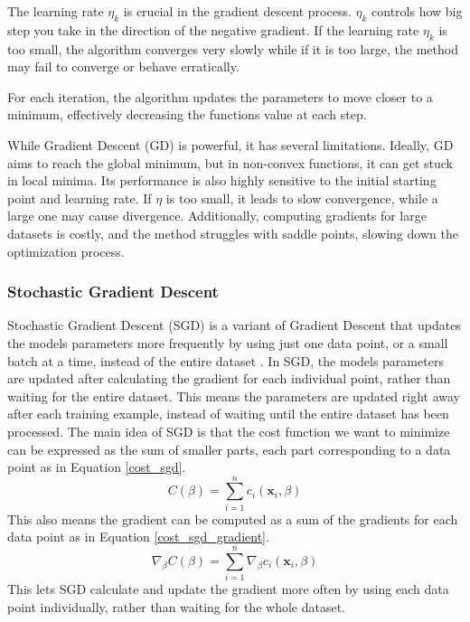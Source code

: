 \documentclass{article}
\newcommand{\0}{\mathbf{0}}
\newcommand{\1}{\mathbf{1}}
\begin{document}
The learning rate \( \eta_k \) is crucial in the gradient descent process. \( \eta_k \) controls how big step you take in the direction of the negative gradient. If the learning rate \( \eta_k \) is too small, the algorithm converges  very slowly while if it is too large, the method may fail to converge or behave erratically. 

For each iteration, the algorithm updates the parameters to move closer to a minimum, effectively decreasing the functions value at each step.




While Gradient Descent (GD) is powerful, it has several limitations. Ideally, GD aims to reach the global minimum, but in non-convex functions, it can get stuck in local minima. Its performance is also highly sensitive to the initial starting point and learning rate. If \(\eta\) is too small, it leads to slow convergence, while a large one may cause divergence. Additionally, computing gradients for large datasets is costly, and the method struggles with saddle points, slowing down the optimization process. 




\subsubsection{Stochastic Gradient Descent}


Stochastic Gradient Descent (SGD) is a variant of Gradient Descent that updates the models parameters more frequently by using just one data point, or a small batch at a time, instead of the entire dataset \cite{uke39}.
In SGD, the models parameters are updated after calculating the gradient for each individual point, rather than waiting for the entire dataset. This means the parameters are updated right away after each training example, instead of waiting until the entire dataset has been processed.
The main idea of SGD is that the cost function we want to minimize can be expressed as the sum of smaller parts, each part corresponding to a data point as in Equation \ref{cost_sgd}.
\begin{equation}
  C(\beta) = \sum_{i=1}^{n} c_i(\bm{x}_i, \beta)
\label{cost_sgd}  
\end{equation}
This also means the gradient can be computed as a sum of the gradients for each data point as in Equation \ref{cost_sgd_gradient}.
\begin{equation}
   \nabla_{\beta} C(\beta) = \sum_{i=1}^{n} \nabla_{\beta} c_i(\bm{x}_i, \beta)
   \label{cost_sgd_gradient}
\end{equation}
This lets SGD calculate and update the gradient more often by using each data point individually, rather than waiting for the whole dataset.
\end{document}
